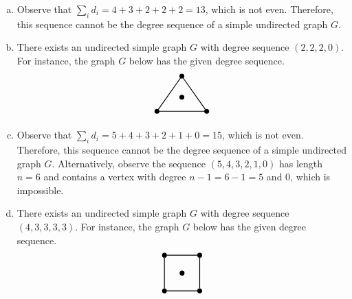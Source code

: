 \documentclass[11pt,letterpaper]{article}
\begin{document}
\begin{enumerate}[(a)]
\item Observe that $\sum_i d_i= 4 + 3 + 2 + 2 + 2= 13$, which is not even. Therefore, this sequence cannot be the degree sequence of a simple undirected graph $G$. \pspace

\item There exists an undirected simple graph $G$ with degree sequence $(2, 2, 2, 0)$. For instance, the graph $G$ below has the given degree sequence. 
	\[
	\begin{tikzpicture}[scale=1.3]
	\node[draw,inner sep=0.5pt,minimum size=1pt,line width=0.03cm,circle,fill=black] at (0, 0.4) (a) {.};
	\node[draw,inner sep=0.5pt,minimum size=1pt,line width=0.03cm,circle,fill=black] at (0, 1) (b) {.};
	\node[draw,inner sep=0.5pt,minimum size=1pt,line width=0.03cm,circle,fill=black] at (-0.7, 0) (c) {.};
	\node[draw,inner sep=0.5pt,minimum size=1pt,line width=0.03cm,circle,fill=black] at (0.7, 0) (d) {.};

	\path[line width=0.03cm] (b) edge node[below] {} (c);
	\path[line width=0.03cm] (b) edge node[below] {} (d);
	\path[line width=0.03cm] (c) edge node[below] {} (d);
	\end{tikzpicture}
	\] \pspace

\item Observe that $\sum_i d_i= 5 + 4 + 3 + 2 + 1 + 0= 15$, which is not even. Therefore, this sequence cannot be the degree sequence of a simple undirected graph $G$. Alternatively, observe the sequence $(5, 4, 3, 2, 1, 0)$ has length $n= 6$ and contains a vertex with degree $n - 1= 6 - 1= 5$ and $0$, which is impossible. \pspace

\item There exists an undirected simple graph $G$ with degree sequence $(4, 3, 3, 3, 3)$. For instance, the graph $G$ below has the given degree sequence. 
	\[
	\begin{tikzpicture}[scale=1.3]
	\node[draw,inner sep=0.5pt,minimum size=1pt,line width=0.03cm,circle,fill=black] at (0, 0) (a) {.};
	\node[draw,inner sep=0.5pt,minimum size=1pt,line width=0.03cm,circle,fill=black] at (1, 0) (b) {.};
	\node[draw,inner sep=0.5pt,minimum size=1pt,line width=0.03cm,circle,fill=black] at (1, 1) (c) {.};
	\node[draw,inner sep=0.5pt,minimum size=1pt,line width=0.03cm,circle,fill=black] at (0, 1) (d) {.};
	\node[draw,inner sep=0.5pt,minimum size=1pt,line width=0.03cm,circle,fill=black] at (0.5, 0.5) (e) {.};

	\path[line width=0.03cm] (a) edge node[below] {} (b);
	\path[line width=0.03cm] (b) edge node[below] {} (c);
	\path[line width=0.03cm] (c) edge node[below] {} (d);
	\path[line width=0.03cm] (a) edge node[below] {} (d);
	

\end{tikzpicture}\]
\end{enumerate}
\end{document}
